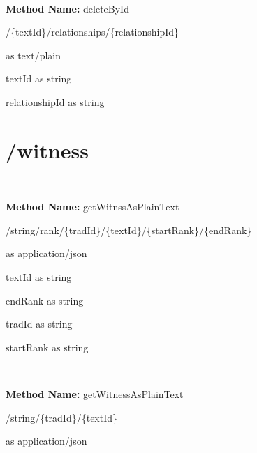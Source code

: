\

\textbf{Method Name: }deleteById
\begin{delete}
/\{textId\}/relationships/\{relationshipId\}
\end{delete}

\begin{response}
 as text/plain
\end{response}

\begin{parameter}
textId as string
\end{parameter}

\begin{parameter}
relationshipId as string
\end{parameter}

\section{/witness}

\

\textbf{Method Name: }getWitnssAsPlainText
\begin{get}
/string/rank/\{tradId\}/\{textId\}/\{startRank\}/\{endRank\}
\end{get}

\begin{response}
 as application/json
\end{response}

\begin{parameter}
textId as string
\end{parameter}

\begin{parameter}
endRank as string
\end{parameter}

\begin{parameter}
tradId as string
\end{parameter}

\begin{parameter}
startRank as string
\end{parameter}

\

\textbf{Method Name: }getWitnessAsPlainText
\begin{get}
/string/\{tradId\}/\{textId\}
\end{get}

\begin{response}
 as application/json
\end{response}


